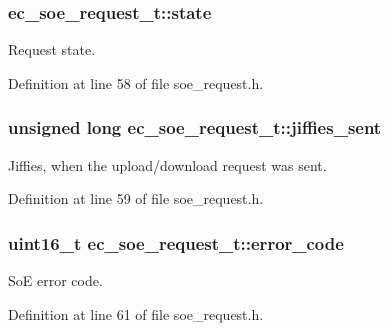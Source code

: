 \subsubsection[{state}]{ ec\-\_\-soe\-\_\-request\-\_\-t\-::state}\label{structec__soe__request__t_ad019a8fb7fd83ffc0744713d0247b217}


Request state. 



Definition at line 58 of file soe\-\_\-request.\-h.

\subsubsection[{jiffies\-\_\-sent}]{\setlength{\rightskip}{0pt plus 5cm}unsigned long ec\-\_\-soe\-\_\-request\-\_\-t\-::jiffies\-\_\-sent}\label{structec__soe__request__t_acb9e954735012f3e149bdd207afbc3a7}


Jiffies, when the upload/download request was sent. 



Definition at line 59 of file soe\-\_\-request.\-h.

\subsubsection[{error\-\_\-code}]{\setlength{\rightskip}{0pt plus 5cm}uint16\-\_\-t ec\-\_\-soe\-\_\-request\-\_\-t\-::error\-\_\-code}\label{structec__soe__request__t_a9fe2cb324e505e6e0123e310dcbc4dcc}


So\-E error code. 



Definition at line 61 of file soe\-\_\-request.\-h.

